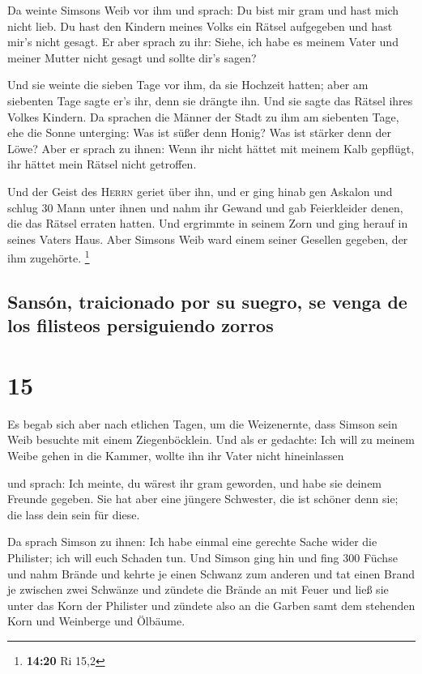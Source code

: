  Da weinte Simsons Weib vor ihm und sprach: Du bist mir
gram und hast mich nicht lieb. Du hast den Kindern meines Volks ein
Rätsel aufgegeben und hast mir's nicht gesagt. Er aber sprach zu ihr:
Siehe, ich habe es meinem Vater und meiner Mutter nicht gesagt und
sollte dir's sagen?

 Und sie weinte die sieben Tage vor ihm, da sie Hochzeit
hatten; aber am siebenten Tage sagte er's ihr, denn sie drängte ihn. Und
sie sagte das Rätsel ihres Volkes Kindern.  Da sprachen
die Männer der Stadt zu ihm am siebenten Tage, ehe die Sonne unterging:
Was ist süßer denn Honig? Was ist stärker denn der Löwe? Aber er sprach
zu ihnen: Wenn ihr nicht hättet mit meinem Kalb gepflügt, ihr hättet
mein Rätsel nicht getroffen.

 Und der Geist des \textsc{Herrn} geriet über ihn, und er
ging hinab gen Askalon und schlug 30 Mann unter ihnen und nahm ihr
Gewand und gab Feierkleider denen, die das Rätsel erraten hatten. Und
ergrimmte in seinem Zorn und ging herauf in seines Vaters Haus.
 Aber Simsons Weib ward einem seiner Gesellen gegeben,
der ihm zugehörte. \footnote{\textbf{14:20} Ri 15,2}

\hypertarget{sansuxf3n-traicionado-por-su-suegro-se-venga-de-los-filisteos-persiguiendo-zorros}{%
\subsection{Sansón, traicionado por su suegro, se venga de los filisteos
persiguiendo
zorros}\label{sansuxf3n-traicionado-por-su-suegro-se-venga-de-los-filisteos-persiguiendo-zorros}}

\hypertarget{section-14}{%
\section{15}\label{section-14}}

 Es begab sich aber nach etlichen Tagen, um die
Weizenernte, dass Simson sein Weib besuchte mit einem Ziegenböcklein.
Und als er gedachte: Ich will zu meinem Weibe gehen in die Kammer,
wollte ihn ihr Vater nicht hineinlassen

 und sprach: Ich meinte, du wärest ihr gram geworden, und
habe sie deinem Freunde gegeben. Sie hat aber eine jüngere Schwester,
die ist schöner denn sie; die lass dein sein für diese.

 Da sprach Simson zu ihnen: Ich habe einmal eine gerechte
Sache wider die Philister; ich will euch Schaden tun.  Und
Simson ging hin und fing 300 Füchse und nahm Brände und kehrte je einen
Schwanz zum anderen und tat einen Brand je zwischen zwei Schwänze
 und zündete die Brände an mit Feuer und ließ sie unter
das Korn der Philister und zündete also an die Garben samt dem stehenden
Korn und Weinberge und Ölbäume.

